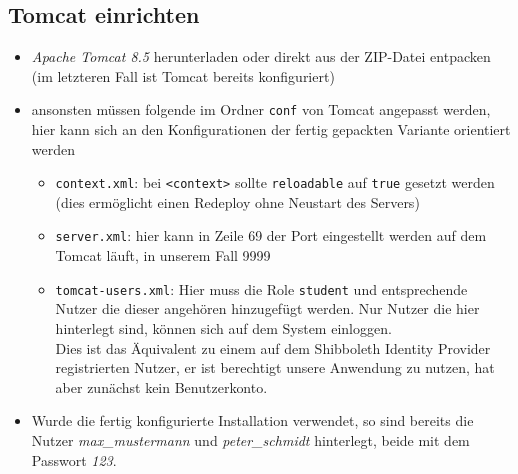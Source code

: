 \subsection{Tomcat einrichten}
\begin{itemize}
	\item \textit{Apache Tomcat 8.5} herunterladen oder direkt aus der ZIP-Datei entpacken (im letzteren Fall ist Tomcat bereits konfiguriert)
	\item ansonsten müssen folgende im Ordner \texttt{conf} von Tomcat angepasst werden, hier kann sich an den Konfigurationen der fertig gepackten Variante orientiert werden
	\begin{itemize}
		\item \texttt{context.xml}: bei \texttt{<context>} sollte \texttt{reloadable} auf \texttt{true} gesetzt werden (dies ermöglicht einen Redeploy ohne Neustart des Servers)
		\item   \texttt{server.xml}: hier kann in Zeile 69 der Port eingestellt werden auf dem Tomcat läuft, in unserem Fall 9999
		\item \texttt{tomcat-users.xml}: Hier muss die Role \texttt{student} und entsprechende Nutzer die dieser angehören hinzugefügt werden. Nur Nutzer die hier hinterlegt sind, können sich auf dem System einloggen. \\
		Dies ist das Äquivalent zu einem auf dem Shibboleth Identity Provider registrierten Nutzer, er ist berechtigt unsere Anwendung zu nutzen, hat aber zunächst kein Benutzerkonto.
	\end{itemize}
	\item Wurde die fertig konfigurierte Installation verwendet, so sind bereits die Nutzer \textit{max\_mustermann} und \textit{peter\_schmidt} hinterlegt, beide mit dem Passwort \textit{123}.
\end{itemize}
